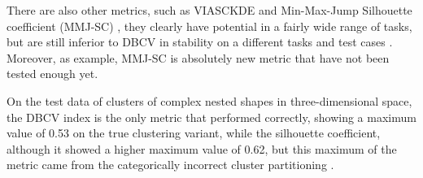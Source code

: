 There are also other metrics, such as VIASCKDE \parencite{viasckde2022} and Min-Max-Jump Silhouette coefficient (MMJ-SC)
\parencite{mmj2023liu, liu2024newindexclusteringevaluation}, they clearly have potential in a fairly wide range of tasks,
but are still inferior to DBCV in stability on a different tasks and test cases \parencite{liu2024newindexclusteringevaluation}.
Moreover, as example, MMJ-SC is absolutely new metric that have not been tested enough yet.

On the test data of clusters of complex nested shapes in three-dimensional space, the DBCV index is the only metric that
performed correctly, showing a maximum value of 0.53 on the true clustering variant, while the silhouette coefficient,
although it showed a higher maximum value of 0.62, but this maximum of the metric came from the categorically incorrect
cluster partitioning \parencite{liu2024newindexclusteringevaluation}.